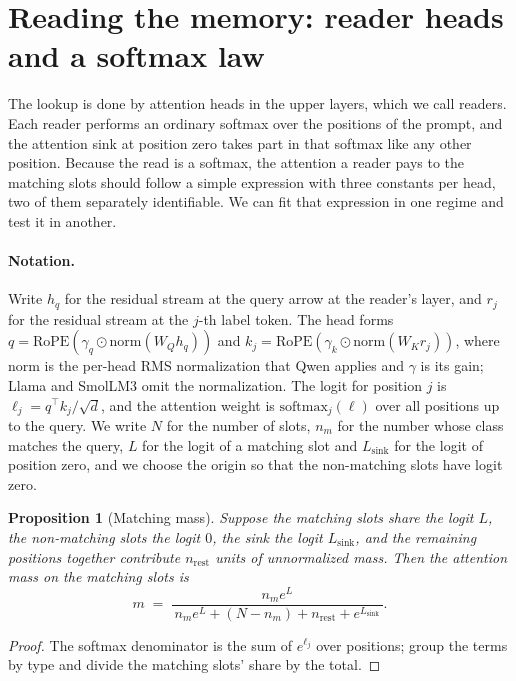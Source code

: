 \documentclass{article}
\newtheorem{proposition}{Proposition}
\begin{document}
\section{Reading the memory: reader heads and a softmax law}\label{sec:read}
The lookup is done by attention heads in the upper layers, which we call readers. Each reader performs an ordinary softmax over the positions of the prompt, and the attention sink at position zero takes part in that softmax like any other position. Because the read is a softmax, the attention a reader pays to the matching slots should follow a simple expression with three constants per head, two of them separately identifiable. We can fit that expression in one regime and test it in another.

\paragraph{Notation.} Write $h_q$ for the residual stream at the query arrow at the reader's layer, and $r_j$ for the residual stream at the $j$-th label token. The head forms $q = \mathrm{RoPE}(\gamma_q \odot \mathrm{norm}(W_Q h_q))$ and $k_j = \mathrm{RoPE}(\gamma_k \odot \mathrm{norm}(W_K r_j))$, where norm is the per-head RMS normalization that Qwen applies and $\gamma$ is its gain; Llama and SmolLM3 omit the normalization. The logit for position $j$ is $\ell_j = q^\top k_j / \sqrt{d}$, and the attention weight is $\mathrm{softmax}_j(\ell)$ over all positions up to the query. We write $N$ for the number of slots, $n_m$ for the number whose class matches the query, $L$ for the logit of a matching slot and $L_{\mathrm{sink}}$ for the logit of position zero, and we choose the origin so that the non-matching slots have logit zero.

\begin{proposition}[Matching mass]\label{prop:law}
Suppose the matching slots share the logit $L$, the non-matching slots the logit $0$, the sink the logit $L_{\mathrm{sink}}$, and the remaining positions together contribute $n_{\mathrm{rest}}$ units of unnormalized mass. Then the attention mass on the matching slots is
\begin{equation}
m \;=\; \frac{n_m e^{L}}{\,n_m e^{L} + (N-n_m) + n_{\mathrm{rest}} + e^{L_{\mathrm{sink}}}\,}.
\label{eq:law}
\end{equation}
\end{proposition}
\begin{proof}
The softmax denominator is the sum of $e^{\ell_j}$ over positions; group the terms by type and divide the matching slots' share by the total.
\end{proof}
\end{document}

